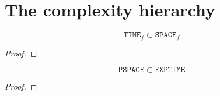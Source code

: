 \section{The complexity hierarchy}
\begin{theorem}
	\[\mathtt{TIME}_f \subset \mathtt{SPACE}_f\]
\end{theorem}
\begin{proof}
	
\end{proof}

\begin{theorem}
	\[\mathtt{PSPACE} \subset \mathtt{EXPTIME}\]
\end{theorem}
\begin{proof}
	
\end{proof}
